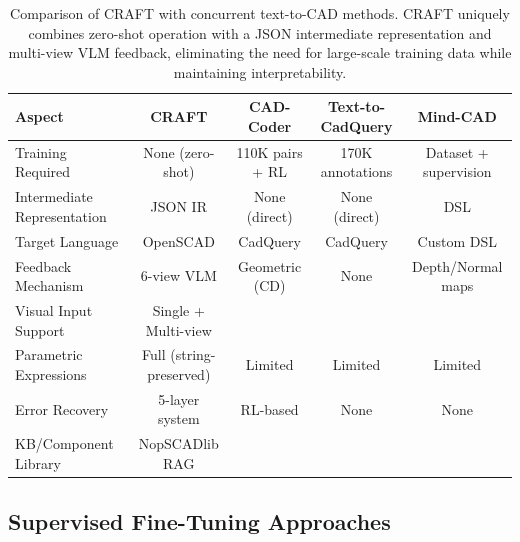 \documentclass[5p,twocolumn,10pt,times]{elsarticle}
\newcommand{\xmark}{\ding{55}}%
\begin{document}

\begin{table}[t]
\centering
\caption{Comparison of CRAFT with concurrent text-to-CAD methods. CRAFT uniquely combines zero-shot operation with a JSON intermediate representation and multi-view VLM feedback, eliminating the need for large-scale training data while maintaining interpretability.}
\label{tab:method-comparison}
\begin{tabular}{lcccc}
\toprule
Aspect & CRAFT & CAD-Coder & Text-to-CadQuery & Mind-CAD \\
\midrule
Training Required & None (zero-shot) & 110K pairs + RL & 170K annotations & Dataset + supervision \\
Intermediate Representation & JSON IR & None (direct) & None (direct) & DSL \\
Target Language & OpenSCAD & CadQuery & CadQuery & Custom DSL \\
Feedback Mechanism & 6-view VLM & Geometric (CD) & None & Depth/Normal maps \\
Visual Input Support & Single + Multi-view & \xmark & \xmark & \xmark \\
Parametric Expressions & Full (string-preserved) & Limited & Limited & Limited \\
Error Recovery & 5-layer system & RL-based & None & None \\
KB/Component Library & NopSCADlib RAG & \xmark & \xmark & \xmark \\
\bottomrule
\end{tabular}
\end{table}

\subsection{Supervised Fine-Tuning Approaches}
\end{document}
